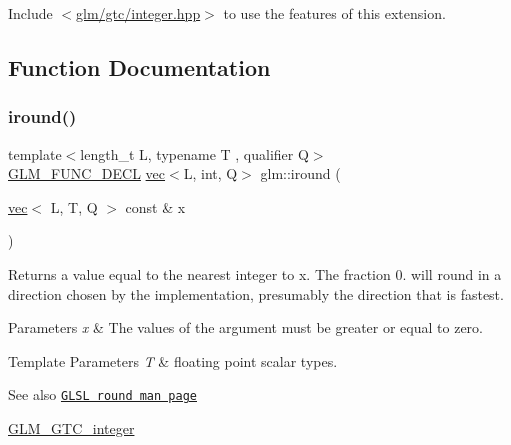 Include $<$\hyperlink{gtc_2integer_8hpp}{glm/gtc/integer.\+hpp}$>$ to use the features of this extension. 

\subsection{Function Documentation}
\mbox{\label{group__gtc__integer_ga57824268ebe13a922f1d69a5d37f637f}} 
\subsubsection{\texorpdfstring{iround()}{iround()}}
{\footnotesize\ttfamily template$<$length\+\_\+t L, typename T , qualifier Q$>$ \\
\hyperlink{setup_8hpp_ab2d052de21a70539923e9bcbf6e83a51}{G\+L\+M\+\_\+\+F\+U\+N\+C\+\_\+\+D\+E\+CL} \hyperlink{structglm_1_1vec}{vec}$<$L, int, Q$>$ glm\+::iround (\begin{DoxyParamCaption}\item[{\hyperlink{structglm_1_1vec}{vec}$<$ L, T, Q $>$ const \&}]{x }\end{DoxyParamCaption})}

Returns a value equal to the nearest integer to x. The fraction 0. will round in a direction chosen by the implementation, presumably the direction that is fastest.


\begin{DoxyParams}{Parameters}
{\em x} & The values of the argument must be greater or equal to zero. \\
\hline
\end{DoxyParams}

\begin{DoxyTemplParams}{Template Parameters}
{\em T} & floating point scalar types.\\
\hline
\end{DoxyTemplParams}
\begin{DoxySeeAlso}{See also}
\href{http://www.opengl.org/sdk/docs/manglsl/xhtml/round.xml}{\tt G\+L\+SL round man page} 

\hyperlink{group__gtc__integer}{G\+L\+M\+\_\+\+G\+T\+C\+\_\+integer} 
\end{DoxySeeAlso}
\mbox{\label{group__gtc__integer_ga9bd682e74bfacb005c735305207ec417}} 
